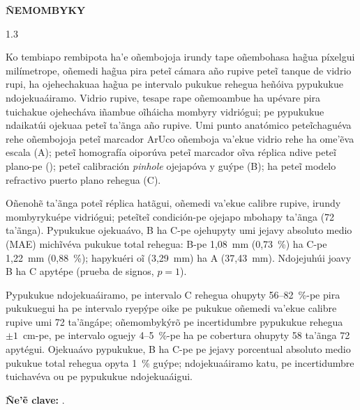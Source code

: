 \begin{center}
  {\Large\bfseries ÑEMOMBYKY}
\end{center}

\vspace{0.8\baselineskip}

\begin{spacing}{1.3}
    \justifying
    \setlength{\parindent}{0pt}
    \setlength{\parskip}{4pt plus 1pt minus 1pt}
    \small

    Ko tembiapo rembipota ha'e oñembojoja irundy tape oñembohasa ha\~{g}ua píxelgui milímetrope, oñemedi ha\~{g}ua pira peteĩ cámara año rupive peteĩ tanque de vidrio rupi, ha ojehechakuaa ha\~{g}ua pe intervalo pukukue rehegua heñóiva pypukukue ndojekuaáiramo. Vidrio rupive, tesape rape oñemoambue ha upévare pira tuichakue ojehecháva iñambue oĩháicha mombyry vidriógui; pe pypukukue ndaikatúi ojekuaa peteĩ ta'ãnga año rupive. Umi punto anatómico peteĩchaguéva rehe oñembojoja peteĩ marcador ArUco oñemboja va'ekue vidrio rehe ha ome'ẽva escala (A); peteĩ homografía oiporúva peteĩ marcador oĩva réplica ndive peteĩ plano-pe (\Aprime{}); peteĩ calibración \emph{pinhole} ojejapóva y guýpe (B); ha peteĩ modelo refractivo puerto plano rehegua (C).

    Oñenohẽ ta'ãnga poteĩ réplica hatãgui, oñemedi va'ekue calibre rupive, irundy mombyrykuépe vidriógui; peteĩteĩ condición-pe ojejapo mbohapy ta'ãnga (72 ta'ãnga). Pypukukue ojekuaávo, B ha C-pe ojehupyty umi jejavy absoluto medio (MAE) michĩvéva pukukue total rehegua: B-pe 1,08~mm (0,73~\%) ha C-pe 1,22~mm (0,88~\%); hapykuéri oĩ \Aprime{} (3,29~mm) ha A (37,43~mm). Ndojejuhúi joavy B ha C apytépe (prueba de signos, $p = 1$).

    Pypukukue ndojekuaáiramo, pe intervalo C rehegua ohupyty 56--82~\%-pe pira pukukuegui ha pe intervalo ryepýpe oike pe pukukue oñemedi va'ekue calibre rupive umi 72 ta'ãngápe; oñemombykýrõ pe incertidumbre pypukukue rehegua $\pm 1$~cm-pe, pe intervalo oguejy 4--5~\%-pe ha pe cobertura ohupyty 58 ta'ãnga 72 apytégui. Ojekuaávo pypukukue, B ha C-pe pe jejavy porcentual absoluto medio pukukue total rehegua opyta 1~\% guýpe; ndojekuaáiramo katu, pe incertidumbre tuichavéva ou pe pypukukue ndojekuaáigui.

    \textbf{Ñe'ẽ clave:} \PalabrasClaveGn.
\end{spacing}
\clearpage
